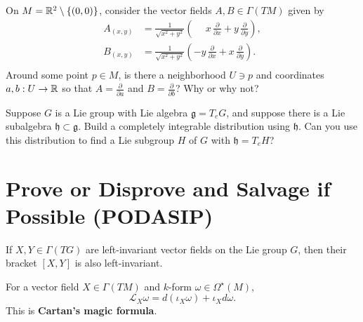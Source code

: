 \documentclass{homework}
\begin{document}
\begin{problem} On $M = \mathbb{R}^2 \setminus \{ (0,0) \}$, consider the
vector fields $A, B \in \Gamma(TM)$ given by
  \begin{align*}
    A_{(x,y)} &= \frac{1}{\sqrt{x^2 + y^2}} \left( \phantom{-} x \, \frac{\partial}{\partial x} + y\, \frac{\partial}{\partial y} \right), \\
    B_{(x,y)} &=  \frac{1}{\sqrt{x^2 + y^2}} \left( -y \,\frac{\partial}{\partial x} + x\, \frac{\partial}{\partial y} \right). \\
  \end{align*} Around some point $p \in M$, is there a neighborhood $U
\ni p$ and coordinates $a, b : U \to \mathbb{R}$ so that $A =
\frac{\partial}{\partial a}$ and $B = \frac{\partial}{\partial b}$?
Why or why not?
\end{problem}

\begin{problem} Suppose $G$ is a Lie group with Lie algebra
$\mathfrak{g} = T_e G$, and suppose there is a Lie subalgebra
$\mathfrak{h} \subset \mathfrak{g}$.  Build a completely integrable
distribution using $\mathfrak{h}$.
Can you use this distribution to find a Lie subgroup $H$ of $G$ with
$\mathfrak{h} = T_e H$?
\end{problem}

\section{Prove or Disprove and Salvage if Possible (PODASIP)}

\begin{problem} If $X, Y \in \Gamma(TG)$ are left-invariant vector
fields on the Lie group $G$, then their bracket $[X,Y]$ is also
left-invariant.
\end{problem}

\begin{problem}\label{cartan-formula}For a vector field $X \in \Gamma(TM)$ and $k$-form $\omega \in \Omega^\star(M)$,
\[
  {\mathcal {L}}_{X}\omega =d(\iota _{X}\omega )+\iota _{X}d\omega.
\]
This is \textbf{Cartan's magic formula}.
\end{problem}
\end{document}
